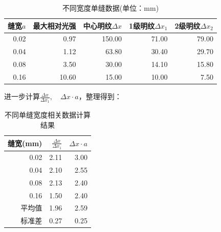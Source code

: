\documentclass[a4paper]{../phyreport}
\begin{document}
\begin{table}[H]
  \centering
  \caption{不同宽度单缝数据(单位：mm)}
    \begin{tabular}{rrrrr}
    \toprule
    \multicolumn{1}{l}{缝宽$a$} & \multicolumn{1}{l}{最大相对光强} & \multicolumn{1}{l}{中心明纹$\Delta x$} & \multicolumn{1}{l}{1级明纹$\Delta x_1$} & \multicolumn{1}{l}{2级明纹$\Delta x_2$} \\
    \midrule
    0.02  & 0.97  & 150.00  & 71.00  & 79.00  \\
    0.04  & 1.12  & 63.80  & 30.40  & 29.70  \\
    0.08  & 3.50  & 30.00  & 14.10  & 15.80  \\
    0.16  & 10.60  & 15.00  & 10.00  & 7.50  \\
    \bottomrule
    \end{tabular}%
  \label{tab:不同宽度单缝数据}%
\end{table}%

进一步计算$\frac{\Delta x}{\Delta x_1},\quad \Delta x \cdot a$，整理得到：

\begin{table}[H]
  \centering
  \caption{不同单缝宽度相关数据计算结果}
    \begin{tabular}{rrr}
    \toprule
    缝宽(mm) & $\frac{\Delta x}{\Delta x_1}$ & $ \Delta x \cdot a$\\
    \midrule
    \multicolumn{1}{r}{0.02} & 2.11  & 3.00  \\
    \multicolumn{1}{r}{0.04} & 2.10  & 2.55  \\
    \multicolumn{1}{r}{0.08} & 2.13  & 2.40  \\
    \multicolumn{1}{r}{0.16} & 1.50  & 2.40  \\
    \midrule
    平均值   & 1.96  & 2.59  \\
    标准差   & 0.27  & 0.25  \\
    \bottomrule
    \end{tabular}%
  \label{tab:不同单缝宽度相关数据计算结果}%
\end{table}%
\end{document}
